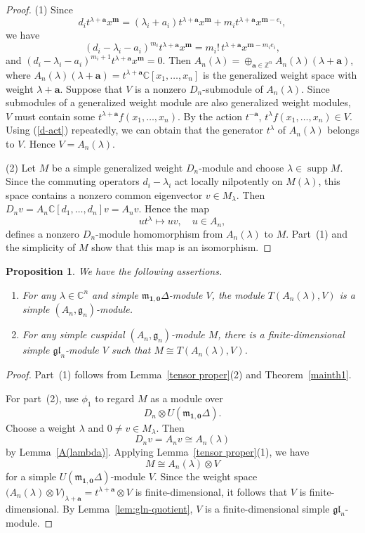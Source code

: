 \documentclass[12pt,a4paper]{amsart}
\def\mg{g}%
\def\gl{gl}%
\newtheorem{proposition}[theorem]{Proposition}%
\numberwithin{equation}{section}
\newcommand{\C}{\mathbb C}
\newcommand{\Z}{\mathbb{Z}}
\def\mg{\mathfrak{g}}
\def\mm{\mathfrak{m}}
\def\gl{\mathfrak{gl}}
\def\ba{\mathbf{a}}
\def\bm{\mathbf{m}}
\def\b1{\mathbf{1}}
\def\bo{\mathbf{0}}
\begin{document}
\begin{proof}
(1) Since
\[
d_it^{\lambda+\ba}x^{\bm}
=(\lambda_i+a_i)t^{\lambda+\ba}x^{\bm}
+m_it^{\lambda+\ba}x^{\bm-e_i},
\]
we have
\begin{equation}\label{d-act}
(d_i-\lambda_i-a_i)^{m_i}t^{\lambda+\ba}x^{\bm}
=m_i!\,t^{\lambda+\ba}x^{\bm-m_ie_i},
\end{equation}
and $(d_i-\lambda_i-a_i)^{m_i+1}t^{\lambda+\ba}x^{\bm}=0$.
Then $A_n(\lambda)=\oplus_{\ba\in \Z^n} A_n(\lambda)(\lambda+\ba)$,
where $A_n(\lambda)(\lambda+\ba)=t^{\lambda+\ba}\C[x_1,\dots,x_n]$
is the generalized weight space with weight $\lambda+\ba$. Suppose that $V$ is a
nonzero $D_n$-submodule of $A_n(\lambda)$. Since submodules of a generalized
weight module are also generalized
weight modules, $V$ must contain some $t^{\lambda+\ba}f(x_1,\dots,x_n)$.
By the action $t^{-\ba}$, $t^{\lambda}f(x_1,\dots,x_n)\in V$. Using (\ref{d-act})
repeatedly, we can obtain that the generator $t^\lambda$ of $A_n(\lambda)$
belongs to $V$. Hence $V=A_n(\lambda)$.

(2) Let \(M\) be a simple generalized weight \(D_n\)-module and
choose \(\lambda\in\operatorname{supp}M\). Since the commuting
operators \(d_i-\lambda_i\) act locally nilpotently on \(M(\lambda)\),
this space contains a nonzero common eigenvector \(v\in M_\lambda\).
Then \(D_nv=A_n\C[d_1,\dots,d_n]v=A_nv\). Hence the map
\[
u t^\lambda\mapsto uv, \quad u\in A_n,
\]
defines a nonzero \(D_n\)-module homomorphism
from $A_n(\lambda)$ to $M$. Part~\textup{(1)} and the simplicity of \(M\)
show that this map is an isomorphism.
\end{proof}


\begin{proposition}\label{(A_n,g_n)-module}
We have the following assertions.
\begin{enumerate}
\item For any \(\lambda\in\C^n\) and simple
\(\mm_{\b1,\bo}\Delta\)-module \(V\), the module
\(T(A_n(\lambda),V)\) is a simple \((A_n,\mg_n)\)-module.
\item For any simple cuspidal \((A_n,\mg_n)\)-module \(M\), there is a
finite-dimensional simple \(\gl_n\)-module \(V\) such that
\(M\cong T(A_n(\lambda),V)\).
\end{enumerate}
\end{proposition}

\begin{proof}
Part~\textup{(1)} follows from Lemma~\ref{tensor proper}(2) and
Theorem~\ref{mainth1}.

For part~\textup{(2)}, use \(\phi_1\) to regard \(M\) as a module over
\[
D_n\otimes U(\mm_{\b1,\bo}\Delta).
\]
Choose a weight \(\lambda\) and \(0\neq v\in M_\lambda\). Then
\[
D_nv=A_nv\cong A_n(\lambda)
\]
by Lemma~\ref{A(lambda)}. Applying Lemma~\ref{tensor proper}(1), we have
\[
M\cong A_n(\lambda)\otimes V
\]
for a simple \(U(\mm_{\b1,\bo}\Delta)\)-module \(V\). Since
the weight space $\bigl(A_n(\lambda)\otimes V\bigr)_{\lambda+\ba}
=t^{\lambda+\ba}\otimes V$ is finite-dimensional,
it follows  that \(V\) is finite-dimensional.
By Lemma~\ref{lem:gln-quotient},   \(V\) is a
finite-dimensional simple \(\gl_n\)-module.
\end{proof}
\end{document}
